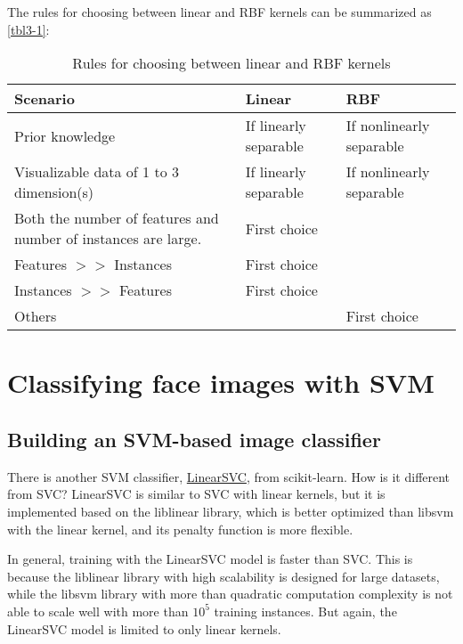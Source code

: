 The rules for choosing between linear and RBF kernels can be summarized as \autoref{tbl3-1}:
\begin{table}
    \centering
    \caption{Rules for choosing between linear and RBF kernels}
    \label{tbl3-1}
    \begin{tabularx}{\textwidth}{Xll}
        \hline
        Scenario                                                        & Linear                & RBF                      \\
        \hline
        Prior knowledge                                                 & If linearly separable & If nonlinearly separable \\
        Visualizable data of 1 to 3 dimension(s)                        & If linearly separable & If nonlinearly separable \\
        Both the number of features and number of instances are  large. & First choice          &                          \\
        Features $>>$ Instances                                         & First choice          &                          \\
        Instances $>>$ Features                                         & First choice          &                          \\
        Others                                                          &                       & First choice             \\
        \hline
    \end{tabularx}
\end{table}
\section{Classifying face images with SVM}
\subsection{Building an SVM-based image classifier}
There is another SVM classifier, \href{https://scikit-learn.org/stable/modules/generated/sklearn.svm.LinearSVC.html}{LinearSVC}, from scikit-learn. How is it different from SVC? LinearSVC is similar to SVC with linear kernels, but it is implemented based on the liblinear library, which is better optimized than libsvm with the linear kernel, and its penalty function is more flexible.

\begin{tcolorbox}
    In general, training with the LinearSVC model is faster than SVC. This is because the liblinear library with high scalability is designed for large datasets, while the libsvm library with more than quadratic computation complexity is not able to scale well with more than $10^5$ training instances. But again, the LinearSVC model is limited to only linear kernels.
\end{tcolorbox}
